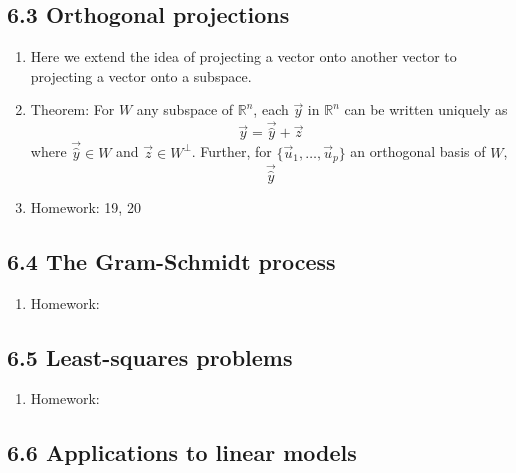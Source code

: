 \documentclass{article}
\begin{document}
\subsection{6.3 Orthogonal projections}

\begin{enumerate}

\item Here we extend the idea of projecting a vector onto another vector to projecting a vector onto a subspace.

\item Theorem: For $W$ any subspace of $\mathbb{R}^n$, each $\vec{y}$ in $\mathbb{R}^n$ can be written uniquely as
\[
\vec{y} = \vec{\hat{y}} + \vec{z}
\]
where $\vec{\hat{y}} \in W$ and $\vec{z} \in W^{\perp}$. Further, for $\{ \vec{u}_1, \dots , \vec{u}_p \}$ an orthogonal basis of $W$, 
\[
\vec{\hat{y}}
\]
\item Homework: 19, 20

\end{enumerate}

\subsection{6.4 The Gram-Schmidt process}

\begin{enumerate}

\item Homework: 

\end{enumerate}

\subsection{6.5 Least-squares problems}

\begin{enumerate}

\item Homework: 

\end{enumerate}

\subsection{6.6 Applications to linear models}
\end{document}

